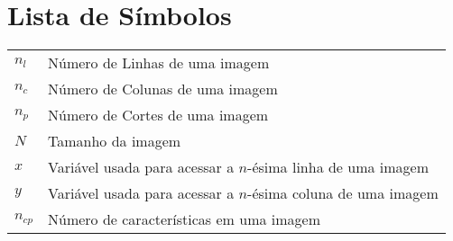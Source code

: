 \documentclass[11pt,twoside,a4paper]{book}
\renewcommand{\chaptermark}[1]{\markboth{\MakeUppercase{#1}}{}}
\begin{document}
\chapter{Lista de Símbolos}
\begin{tabular}{ll}
        $n_l$   & Número de Linhas de uma imagem \\
        $n_c$   & Número de Colunas de uma imagem \\
        $n_p$   & Número de Cortes de uma imagem \\
        $N$     & Tamanho da imagem \\
        $x$     & Variável usada para acessar a $n$-ésima linha de uma imagem \\
        $y$     & Variável usada para acessar a $n$-ésima coluna de uma imagem \\
        $n_{cp}$  & Número de características em uma imagem \\
\end{tabular}

\listoffigures
\listoftables

\mainmatter

\fancyhead[RE,LO]{\thesection}

\singlespacing              %


\renewcommand{\chaptermark}[1]{\markboth{\MakeUppercase{\appendixname\ \thechapter}} {\MakeUppercase{#1}} }
\fancyhead[RE,LO]{}
\appendix

\backmatter \singlespacing   %

\printindex   %
\end{document}
